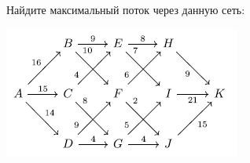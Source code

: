 \begin{problem}[14]

	Найдите максимальный поток через данную сеть:
    
    \centering\includegraphics[width=0.55\linewidth]{pics/14thGraph.png}
    
\end{problem}


